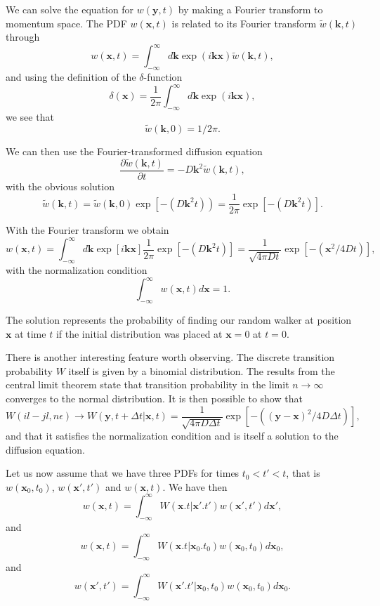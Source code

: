 We can solve the equation for $w(\mathbf{y},t)$ by making a Fourier transform to
momentum space. 
The PDF $w(\mathbf{x},t)$ is related to its Fourier transform
$\tilde{w}(\mathbf{k},t)$ through
\[
   w(\mathbf{x},t) = \int_{-\infty}^{\infty}d\mathbf{k} \exp{(i\mathbf{kx})}\tilde{w}(\mathbf{k},t),
\]
and using the definition of the 
$\delta$-function 
\[
   \delta(\mathbf{x}) = \frac{1}{2\pi} \int_{-\infty}^{\infty}d\mathbf{k} \exp{(i\mathbf{kx})},
\]
 we see that
\[
   \tilde{w}(\mathbf{k},0)=1/2\pi.
\]

We can then use the Fourier-transformed diffusion equation 
\[
    \frac{\partial \tilde{w}(\mathbf{k},t)}{\partial t} = -D\mathbf{k}^2\tilde{w}(\mathbf{k},t),
\]
with the obvious solution
\[
   \tilde{w}(\mathbf{k},t)=\tilde{w}(\mathbf{k},0)\exp{\left[-(D\mathbf{k}^2t)\right)}=
    \frac{1}{2\pi}\exp{\left[-(D\mathbf{k}^2t)\right]}. 
\]

With the Fourier transform we obtain 
\[
   w(\mathbf{x},t)=\int_{-\infty}^{\infty}d\mathbf{k} \exp{\left[i\mathbf{kx}\right]}\frac{1}{2\pi}\exp{\left[-(D\mathbf{k}^2t)\right]}=
    \frac{1}{\sqrt{4\pi Dt}}\exp{\left[-(\mathbf{x}^2/4Dt)\right]}, 
\]
with the normalization condition
\[
   \int_{-\infty}^{\infty}w(\mathbf{x},t)d\mathbf{x}=1.
\]

The solution represents the probability of finding
our random walker at position $\mathbf{x}$ at time $t$ if the initial distribution 
was placed at $\mathbf{x}=0$ at $t=0$. 

There is another interesting feature worth observing. The discrete transition probability $W$
itself is given by a binomial distribution.
The results from the central limit theorem state that 
transition probability in the limit $n\rightarrow \infty$ converges to the normal 
distribution. It is then possible to show that
\[
    W(il-jl,n\epsilon)\rightarrow W(\mathbf{y},t+\Delta t|\mathbf{x},t)=
    \frac{1}{\sqrt{4\pi D\Delta t}}\exp{\left[-((\mathbf{y}-\mathbf{x})^2/4D\Delta t)\right]},
\]
and that it satisfies the normalization condition and is itself a solution
to the diffusion equation.

Let us now assume that we have three PDFs for times $t_0 < t' < t$, that is
$w(\mathbf{x}_0,t_0)$, $w(\mathbf{x}',t')$ and $w(\mathbf{x},t)$.
We have then  
\[
   w(\mathbf{x},t)= \int_{-\infty}^{\infty} W(\mathbf{x}.t|\mathbf{x}'.t')w(\mathbf{x}',t')d\mathbf{x}',
\]
and
\[
   w(\mathbf{x},t)= \int_{-\infty}^{\infty} W(\mathbf{x}.t|\mathbf{x}_0.t_0)w(\mathbf{x}_0,t_0)d\mathbf{x}_0,
\]
and
\[
   w(\mathbf{x}',t')= \int_{-\infty}^{\infty} W(\mathbf{x}'.t'|\mathbf{x}_0,t_0)w(\mathbf{x}_0,t_0)d\mathbf{x}_0.
\]


